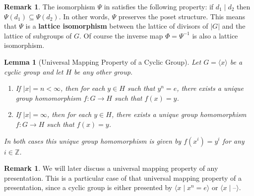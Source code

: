 \documentclass[12pt]{report}
\newtheorem{lemma}[theorem]{Lemma}
\numberwithin{equation}{section}
\numberwithin{theorem}{chapter}
\theoremstyle{definition}
\newtheorem*{basic properties}{Basic Properties}
\newtheorem*{Important Remark}{Important Remark}
\newtheorem{remark}[theorem]{Remark}
\newcommand{\df}[1]{{\bf #1}\index{#1}}
\newcommand{\Z}{\mathbb{Z}}
\begin{document}
\begin{remark}
The isomorphism $\Psi$ in  satisfies the following property: if $d_1\mid d_2$ then $\Psi(d_1)\subseteq \Psi(d_2)$. In other words, $\Psi$ preserves the poset structure. This means that $\Psi$ is a \df{lattice isomorphism} between the lattice of divisors of $|G|$ and the lattice of subgroups of $G$. Of course the inverse map $\Phi =\Psi^{-1}$ is also a lattice isomorphism.
\end{remark}

\begin{lemma}[Universal Mapping Property of a Cyclic Group]\label{UMP for cyclic groups}
Let $G = \langle x \rangle$ be a cyclic group and let $H$ be any other group. 

\begin{enumerate}
	\item If $|x| = n < \infty$, then for each $y \in H$ such that $y^n = e$, 
there exists a unique group homomorphism $f\!: G \to H$ such that $f(x) = y$. 

\item If $|x| = \infty$, then for each $y \in H$,  there exists a unique group homomorphism $f\!: G \to H$ such that $f(x) = y$. 
\end{enumerate}
In both cases this unique group homomorphism is given by $f(x^i)=y^i$ for any $i \in \Z$.
\end{lemma}

\begin{remark} 
We will later discuss a universal mapping property of any presentation.
This is a particular case of that universal mapping property of a presentation, since a cyclic group is either presented by $\langle x \mid x^n = e \rangle$ or $\langle x \mid \textrm{--} \rangle$.
\end{remark}
\end{document}
